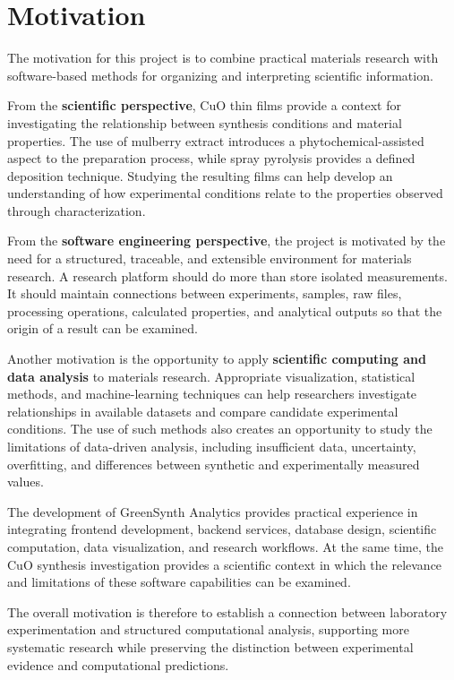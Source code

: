 \documentclass[12pt,a4paper,oneside]{report}
\begin{document}
{{{\section{Motivation}

The motivation for this project is to combine practical materials research with software-based methods for organizing and interpreting scientific information.

From the \textbf{scientific perspective}, $\text{CuO}$ thin films provide a context for investigating the relationship between synthesis conditions and material properties. The use of mulberry extract introduces a phytochemical-assisted aspect to the preparation process, while spray pyrolysis provides a defined deposition technique. Studying the resulting films can help develop an understanding of how experimental conditions relate to the properties observed through characterization.

From the \textbf{software engineering perspective}, the project is motivated by the need for a structured, traceable, and extensible environment for materials research. A research platform should do more than store isolated measurements. It should maintain connections between experiments, samples, raw files, processing operations, calculated properties, and analytical outputs so that the origin of a result can be examined.

Another motivation is the opportunity to apply \textbf{scientific computing and data analysis} to materials research. Appropriate visualization, statistical methods, and machine-learning techniques can help researchers investigate relationships in available datasets and compare candidate experimental conditions. The use of such methods also creates an opportunity to study the limitations of data-driven analysis, including insufficient data, uncertainty, overfitting, and differences between synthetic and experimentally measured values.

The development of GreenSynth Analytics provides practical experience in integrating frontend development, backend services, database design, scientific computation, data visualization, and research workflows. At the same time, the $\text{CuO}$ synthesis investigation provides a scientific context in which the relevance and limitations of these software capabilities can be examined.

The overall motivation is therefore to establish a connection between laboratory experimentation and structured computational analysis, supporting more systematic research while preserving the distinction between experimental evidence and computational predictions.

}}}
\end{document}
